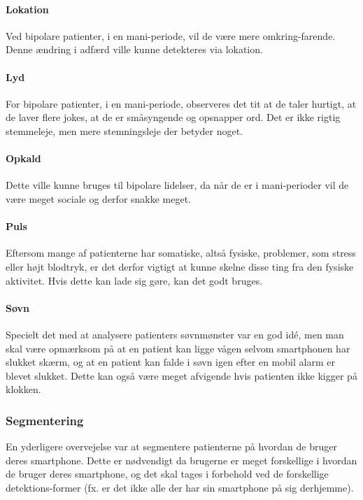 \paragraph{Lokation}
Ved bipolare patienter, i en mani-periode, vil de være mere omkring-farende.
Denne ændring i adfærd ville kunne detekteres via lokation.

\paragraph{Lyd}
For bipolare patienter, i en mani-periode, observeres det tit at de taler hurtigt, at de laver flere jokes, at de er småsyngende og opsnapper ord. Det er ikke rigtig stemmeleje, men mere stemningsleje der betyder noget.

\paragraph{Opkald}
Dette ville kunne bruges til bipolare lidelser, da når de er i mani-perioder vil de være meget sociale og derfor snakke meget. 

\paragraph{Puls}
Eftersom mange af patienterne har somatiske, altså fysiske, problemer, som stress eller højt blodtryk, er det derfor vigtigt at kunne skelne disse ting fra den fysiske aktivitet.
Hvis dette kan lade sig gøre, kan det godt bruges.

\paragraph{Søvn}
Specielt det med at analysere patienters søvnmønster var en god idé, men man skal være opmærksom på at en patient kan ligge vågen selvom smartphonen har slukket skærm, og at en patient kan falde i søvn igen efter en mobil alarm er blevet slukket.
Dette kan også være meget afvigende hvis patienten ikke kigger på klokken.

\subsubsection{Segmentering}
En yderligere overvejelse var at segmentere patienterne på hvordan de bruger deres smartphone.
Dette er nødvendigt da brugerne er meget forskellige i hvordan de bruger deres smartphone, og det skal tages i forbehold ved de forskellige detektions-former (fx. er det ikke alle der har sin smartphone på sig derhjemme).

